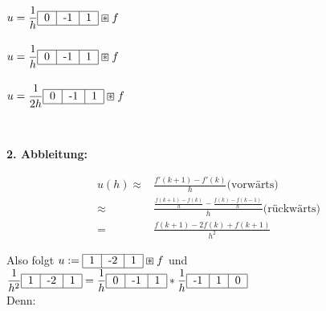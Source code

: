 \documentclass{article}
\theoremstyle{plain}
\theoremstyle{definition}
\numberwithin{equation}{section}
\newcommand{\mtitle}[1] {
    \begin{center}
        \large{\textbf{#1}}
    \end{center}
}
\begin{document}
    \begin{minipage}[c]{0.3\linewidth}
        \ \\
        $u=\displaystyle \frac{1}{h}\begin{tabular}{|c|c|c|}
            \hline
            0 & -1 & 1\\
            \hline
        \end{tabular} \boxast f$\\
        \ \\
        $u=\displaystyle \frac{1}{h}\begin{tabular}{|c|c|c|}
            \hline
            0 & -1 & 1\\
            \hline
        \end{tabular} \boxast f$\\
        \ \\
        $u=\displaystyle \frac{1}{2h}\begin{tabular}{|c|c|c|}
            \hline
            0 & -1 & 1\\
            \hline
            \end{tabular} \boxast f$\\
    \end{minipage}
    \ \\

    \mtitle{2. Abbleitung:}

    \begin{align*}
        u(h) \approx & \frac{f'(k+1) - f'(k)}{h} \text{(vorwärts)}\\
        \approx & \frac{\frac{f(k+1) - f(k)}{h} - \frac{f(k) - f(k-1)}{h}}{h} \text{(rückwärts)} \\
        = & \frac{f(k+1) -2 f(k) + f(k+1)}{h^2}
    \end{align*}

    Also folgt $\displaystyle u:=\begin{tabular}{|c|c|c|}
        \hline
        1 & -2 & 1\\
        \hline
        \end{tabular} \boxast f$ und $\displaystyle \frac{1}{h^2}\begin{tabular}{|c|c|c|}
            \hline
            1 & -2 & 1\\
            \hline
            \end{tabular} = \frac{1}{h}\begin{tabular}{|c|c|c|}
                \hline
                0 & -1 & 1\\
                \hline
                \end{tabular} * \frac{1}{h}\begin{tabular}{|c|c|c|}
                    \hline
                    -1 & 1 & 0\\
                    \hline
                    \end{tabular}$\\
    Denn:
\end{document}
